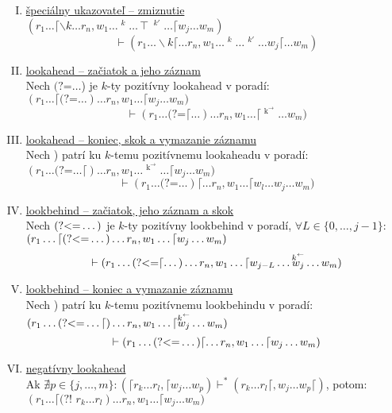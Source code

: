 \documentclass{svk_long_sk}
\def\lookahead{\text{(?=}}
\def\nlookahead{\text{(?!~}}
\def\lookbehind{\text{(?\textless =}}
\begin{document}
\begin{definition}
\begin{enumerate}[I.]
\item \underline{špeciálny ukazovateľ -- zmiznutie}
\\ $\displaystyle{(r_1 \dots \lceil \backslash k \dots r_n,w_1\dots\mathop{w_a}^k\ldots \intercal  \mathop{w_b}^{k'} \dots \lceil w_j\dots w_m)}$
$$\vdash(r_1 \dots  \backslash k \lceil \dots r_n,w_1\dots\mathop{w_a}^k\dots \mathop{w_b}^{k'} \dots  w_j\lceil\dots w_m)$$
\item \underline{lookahead -- začiatok a jeho záznam} 
\\ Nech $\lookahead \dots$) je $k$-ty pozitívny lookahead v poradí: 
\\ $\displaystyle{(r_1\dots \lceil \lookahead \dots) \dots r_n, w_1\dots\lceil w_j\dots w_m )}$
$$ \vdash(r_1\dots \lookahead\lceil\dots) \dots r_n, w_1\dots\lceil \mathop{w_j}^{\mathop{k}^\rightarrow}\dots w_m ) $$
\item \underline{lookahead -- koniec, skok a vymazanie záznamu}
\\ Nech ) patrí ku $k$-temu pozitívnemu lookaheadu v poradí: 
\\ $\displaystyle{(r_1\dots \lookahead\dots\lceil) \dots r_n, w_1\dots \mathop{w_l}^{\mathop{k}^\rightarrow}\dots\lceil w_j\dots w_m )} $
$$ \vdash(r_1\dots \lookahead\dots)\lceil \dots r_n, w_1\dots \lceil w_l \dots w_j\dots w_m ) $$
\item \underline{lookbehind -- začiatok, jeho záznam a skok}
\\ Nech $\lookbehind\dots)$ je $k$-ty pozitívny lookbehind v poradí, $\forall L\in\lbrace 0,\dots, j-1\rbrace$:
\\ $\displaystyle{(r_1\dots \lceil \lookbehind\dots) \dots r_n, w_1\dots\lceil w_j\dots w_m )}$
$$ \vdash (r_1\dots \lookbehind\lceil\dots) \dots r_n, w_1\dots\lceil w_{j-L}\dots \mathop{w_j}^{\mathop{k}^\leftarrow} \dots w_m ) $$
\item \underline{lookbehind -- koniec a vymazanie záznamu}
\\ Nech ) patrí ku $k$-temu pozitívnemu lookbehindu v poradí:
\\ $\displaystyle{(r_1\dots \lookbehind\dots\lceil) \dots r_n, w_1\dots \lceil \mathop{w_j}^{\mathop{k}^\leftarrow} \dots w_m )}$
$$ \vdash(r_1\dots \lookbehind\dots)\lceil \dots r_n, w_1 \dots \lceil w_j \dots w_m ) $$
\item \underline{negatívny lookahead}
\\ Ak $\nexists p \in \lbrace j,\dots,m\rbrace: (\lceil r_k\dots r_l,\lceil w_j\dots w_p) \vdash^* (r_k\dots r_l\lceil, w_j\dots w_p \lceil)$, potom:
\\$\displaystyle{(r_1\dots\lceil \nlookahead r_{k}\dots r_{l} ) \dots r_n, w_1\dots \lceil w_j \dots w_m)}$

\end{enumerate}
\end{definition}
\end{document}
